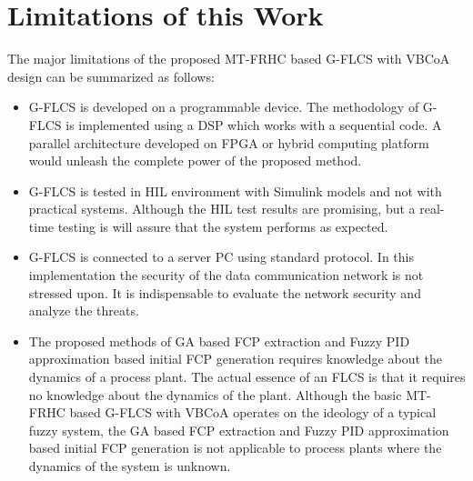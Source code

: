 \section{Limitations of this Work}
The major limitations of the proposed MT-FRHC based G-FLCS with VBCoA design can be summarized as follows:
\begin{itemize}
	\item G-FLCS is developed on a programmable device. The methodology of G-FLCS is implemented using a DSP which works with a sequential code. A parallel architecture developed on FPGA or hybrid computing platform would unleash the complete power of the proposed method.
	\item G-FLCS is tested in HIL environment with Simulink models and not with practical systems. Although the HIL test results are promising, but a real-time testing is will assure that the system performs as expected. 
	\item G-FLCS is connected to a server PC using standard protocol. In this implementation the security of the data communication network is not stressed upon. It is indispensable to evaluate the network security and analyze the threats. 
	\item The proposed methods of GA based FCP extraction and Fuzzy PID approximation based initial FCP generation requires knowledge about the dynamics of a process plant. The actual essence of an FLCS is that it requires no knowledge about the dynamics of the plant. Although the basic MT-FRHC based G-FLCS with VBCoA operates on the ideology of a typical fuzzy system, the GA based FCP extraction and Fuzzy PID approximation based initial FCP generation is not applicable to process plants where the dynamics of the system is unknown.     
\end{itemize}

